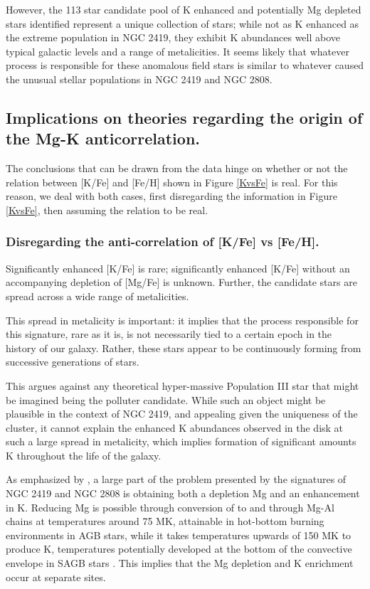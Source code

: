 \documentclass[a4paper,fleqn,usenatbib]{mnras}
\begin{document}
However, the 113 star candidate pool of K enhanced and potentially Mg depleted stars identified represent a unique collection of stars; while not as K enhanced as the extreme population in NGC 2419, they exhibit K abundances well above typical galactic levels and a range of metalicities. It seems likely that whatever process is responsible for these anomalous field stars is similar to whatever caused the unusual stellar populations in NGC 2419 and NGC 2808.

\subsection{Implications on theories regarding the origin of the Mg-K anticorrelation.}

The conclusions that can be drawn from the data hinge on whether or not the relation between [K/Fe] and [Fe/H] shown in Figure \ref{KvsFe} is real. For this reason, we deal with both cases, first disregarding the information in Figure \ref{KvsFe}, then assuming the relation to be real.

\subsubsection{Disregarding the anti-correlation of [K/Fe] vs [Fe/H].}

Significantly enhanced [K/Fe] is rare; significantly enhanced [K/Fe] without an accompanying depletion of [Mg/Fe] is unknown. Further, the candidate stars are spread across a wide range of metalicities.

This spread in metalicity is important: it implies that the process responsible for this signature, rare as it is, is not necessarily tied to a certain epoch in the history of our galaxy. Rather, these stars appear to be continuously forming from successive generations of stars. 

This argues against any theoretical hyper-massive Population III star that might be imagined being the polluter candidate. While such an object might be plausible in the context of NGC 2419, and appealing given the uniqueness of the cluster, it cannot explain the enhanced K abundances observed in the disk at such a large spread in metalicity, which implies formation of significant amounts K throughout the life of the galaxy.

As emphasized by \cite{prantzos2017}, a large part of the problem presented by the signatures of NGC 2419 and NGC 2808 is obtaining both a depletion Mg and an enhancement in K. Reducing Mg is possible through conversion of  to  and through Mg-Al chains at temperatures around 75 MK, attainable in hot-bottom burning environments in AGB stars, while it takes temperatures upwards of 150 MK to produce K, temperatures potentially developed at the bottom of the convective envelope in SAGB stars \citep{iliadis2016}. This implies that the Mg depletion and K enrichment occur at separate sites.
\end{document}
